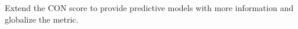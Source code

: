 \documentclass[preview]{standalone}
\begin{document}
Extend the CON score to provide predictive models with more information and globalize the metric.\\
\end{document}
